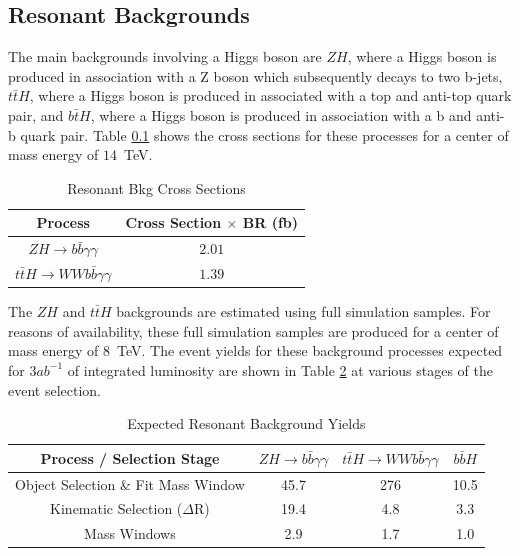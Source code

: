 \documentclass{cmspaper}
\begin{document}
\subsection{Resonant Backgrounds}
The main backgrounds involving a Higgs boson are $ZH$, where a Higgs boson is produced in association
with a Z boson which subsequently decays to two b-jets, $t\bar{t}H$, where a Higgs boson is produced
in associated with a top and anti-top quark pair, and $b\bar{t}H$, where a Higgs boson is produced in
association with a b and anti-b quark pair. Table \ref{} shows the cross sections for these processes
for a center of mass energy of $14$~TeV.


\begin{table}[!ht]
\begin{center} 
\begin{tabular}{|c|c|}
\hline
Process                                           &   Cross Section $\times$ BR (fb)   \\  \hline
$ZH \rightarrow b\bar{b}\gamma\gamma$             &   $2.01$                           \\\hline
$t\bar{t}H \rightarrow W W b \bar{b}\gamma\gamma$ &   $1.39$                           \\\hline

\end{tabular}
\caption{Resonant Bkg Cross Sections }
\label{tab:ResonantBkgCrossSections}
\end{center}
\end{table}

The $ZH$ and $t\bar{t}H$ backgrounds are estimated using full simulation samples. For reasons of 
availability, these full simulation samples are produced for a center of mass energy of $8$~TeV.
The event yields for these background processes expected for $3 ab^{-1}$ of integrated luminosity
are shown in Table \ref{tab:resonantBkgEventYields} at various stages of the event selection.

\begin{table}[!ht]
\begin{center} 
\begin{tabular}{|c|c|c|c|}
\hline
Process / Selection Stage            &  $ZH \rightarrow b\bar{b}\gamma\gamma$ &  $t\bar{t}H \rightarrow W W b \bar{b}\gamma\gamma$ &  $b\bar{b}H$     \\  \hline
Object Selection \& Fit Mass Window  &  45.7                                  &  276                                               &  10.5            \\ 
Kinematic Selection ($\Delta$R)      &  19.4                                  &  4.8                                               &  3.3             \\ 
Mass Windows                         &  2.9                                   &  1.7                                               &  1.0             \\  \hline

\end{tabular}
\caption{Expected Resonant Background Yields }
\label{tab:resonantBkgEventYields}
\end{center}
\end{table}
\end{document}
